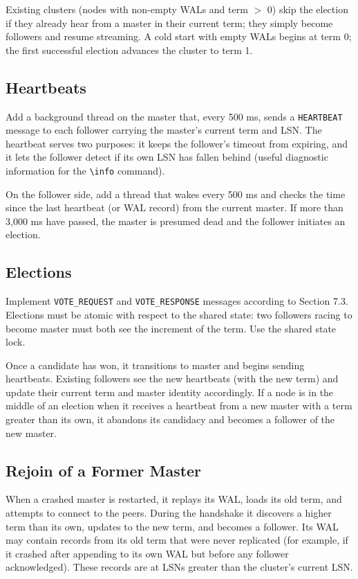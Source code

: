 \documentclass[11pt,a4paper]{article}
\begin{document}
Existing clusters (nodes with non-empty WALs and term $>$ 0) skip the election if they already hear from a master in their current term; they simply become followers and resume streaming. A cold start with empty WALs begins at term 0; the first successful election advances the cluster to term 1.

\subsection{Heartbeats}
Add a background thread on the master that, every 500 ms, sends a \texttt{HEARTBEAT} message to each follower carrying the master's current term and LSN. The heartbeat serves two purposes: it keeps the follower's timeout from expiring, and it lets the follower detect if its own LSN has fallen behind (useful diagnostic information for the \verb|\info| command).

On the follower side, add a thread that wakes every 500 ms and checks the time since the last heartbeat (or WAL record) from the current master. If more than 3{,}000 ms have passed, the master is presumed dead and the follower initiates an election.

\subsection{Elections}
Implement \texttt{VOTE\_REQUEST} and \texttt{VOTE\_RESPONSE} messages according to Section 7.3. Elections must be atomic with respect to the shared state: two followers racing to become master must both see the increment of the term. Use the shared state lock.

Once a candidate has won, it transitions to master and begins sending heartbeats. Existing followers see the new heartbeats (with the new term) and update their current term and master identity accordingly. If a node is in the middle of an election when it receives a heartbeat from a new master with a term greater than its own, it abandons its candidacy and becomes a follower of the new master.

\subsection{Rejoin of a Former Master}
When a crashed master is restarted, it replays its WAL, loads its old term, and attempts to connect to the peers. During the handshake it discovers a higher term than its own, updates to the new term, and becomes a follower. Its WAL may contain records from its old term that were never replicated (for example, if it crashed after appending to its own WAL but before any follower acknowledged). These records are at LSNs greater than the cluster's current LSN.
\end{document}
